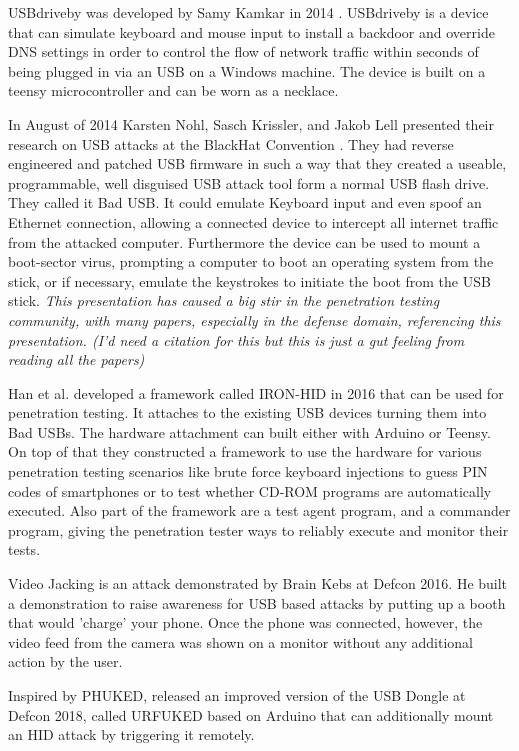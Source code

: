 USBdriveby was developed by Samy Kamkar in 2014 \cite{SamyKamkarUSBdriveby}. USBdriveby is a device that can simulate keyboard and mouse input to install a backdoor and override DNS settings in order to control the flow of network traffic within seconds of being plugged in via an USB on a Windows machine. The device is built on a teensy microcontroller and can be worn as a necklace.

In August of 2014 Karsten Nohl, Sasch Krissler, and Jakob Lell presented their research on USB attacks at the BlackHat Convention \cite{Srlabsbadusbblackhatv1Pdf2014}. They had reverse engineered and patched USB firmware in such a way that they created a useable, programmable, well disguised USB attack tool form a normal USB flash drive. They called it Bad USB. It could emulate Keyboard input and even spoof an Ethernet connection, allowing a connected device to intercept all internet traffic from the attacked computer. Furthermore the device can be used to mount a boot-sector virus, prompting a computer to boot an operating system from the stick, or if necessary, emulate the keystrokes to initiate the boot from the USB stick. \textit{This presentation has caused a big stir in the penetration testing community, with many papers, especially in the defense domain, referencing this presentation. (I'd need a citation for this but this is just a gut feeling from reading all the papers)}

Han et al.\cite{hanIRONHIDCreateYour2016} developed a framework called IRON-HID in 2016 that can be used for penetration testing. It attaches to the existing USB devices turning them into Bad USBs. The hardware attachment can built either with Arduino or Teensy. On top of that they constructed a framework to use the hardware for various penetration testing scenarios like brute force keyboard injections to guess PIN codes of smartphones or to test whether CD-ROM programs are automatically executed. Also part of the framework are a test agent program, and a commander program, giving the penetration tester ways to reliably execute and monitor their tests.   

Video Jacking is an attack demonstrated by Brain Kebs \cite{RoadWarriorsBeware2016} at Defcon 2016. He built a demonstration to raise awareness for USB based attacks by putting up a booth that would 'charge' your phone. Once the phone was connected, however, the video feed from the camera was shown on a monitor without any additional action by the user. 

Inspired by PHUKED, \cite{elkinsHackingHardwareIntroducing} released an improved version of the USB Dongle at Defcon 2018, called URFUKED 
based on Arduino that can additionally mount an HID attack by triggering it remotely.  

